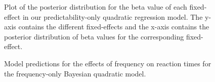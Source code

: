 \documentclass[
  authoryear,
  preprint,
  1p,
  onecolumn]{elsarticle}
\begin{document}
\begin{figure}


\caption{\label{fig-PredicOnlyBetaPlot}Plot of the posterior
distribution for the beta value of each fixed-effect in our
predictability-only quadratic regression model. The y-axis contains the
different fixed-effects and the x-axis contains the posterior
distribution of beta values for the corresponding fixed-effect.}

\end{figure}%

\begin{figure}


\caption{\label{fig-FreqOnlyPlot}Model predictions for the effects of
frequency on reaction times for the frequency-only Bayesian quadratic
model.}

\end{figure}%
\end{document}
